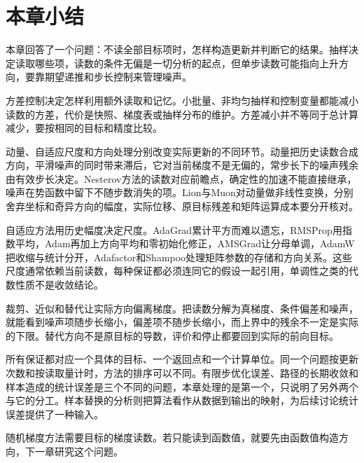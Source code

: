\section{本章小结}
\label{sec:sgd-summary}

本章回答了一个问题：不读全部目标项时，怎样构造更新并判断它的结果。抽样决定读取哪些项，读数的条件无偏是一切分析的起点，但单步读数可能指向上升方向，要靠期望递推和步长控制来管理噪声。

方差控制决定怎样利用额外读取和记忆。小批量、非均匀抽样和控制变量都能减小读数的方差，代价是快照、梯度表或抽样分布的维护。方差减小并不等同于总计算减少，要按相同的目标和精度比较。

动量、自适应尺度和方向处理分别改变实际更新的不同环节。动量把历史读数合成方向，平滑噪声的同时带来滞后，它对当前梯度不是无偏的，常步长下的噪声残余由有效步长决定。Nesterov方法的读数对应前瞻点，确定性的加速不能直接继承，噪声在势函数中留下不随步数消失的项。Lion与Muon对动量做非线性变换，分别舍弃坐标和奇异方向的幅度，实际位移、原目标残差和矩阵运算成本要分开核对。

自适应方法用历史幅度决定尺度。AdaGrad累计平方而难以遗忘，RMSProp用指数平均，Adam再加上方向平均和零初始化修正，AMSGrad让分母单调，AdamW把收缩与统计分开，Adafactor和Shampoo处理矩阵参数的存储和方向关系。这些尺度通常依赖当前读数，每种保证都必须连同它的假设一起引用，单调性之类的代数性质不是收敛结论。

裁剪、近似和替代让实际方向偏离梯度。把读数分解为真梯度、条件偏差和噪声，就能看到噪声项随步长缩小，偏差项不随步长缩小，而上界中的残余不一定是实际的下限。替代方向不是原目标的导数，评价和停止都要回到实际的前向目标。

所有保证都对应一个具体的目标、一个返回点和一个计算单位。同一个问题按更新次数和按读取量计时，方法的排序可以不同。有限步优化误差、路径的长期收敛和样本造成的统计误差是三个不同的问题，本章处理的是第一个，只说明了另外两个与它的分工。样本替换的分析则把算法看作从数据到输出的映射，为后续讨论统计误差提供了一种输入。

随机梯度方法需要目标的梯度读数。若只能读到函数值，就要先由函数值构造方向，下一章研究这个问题。
